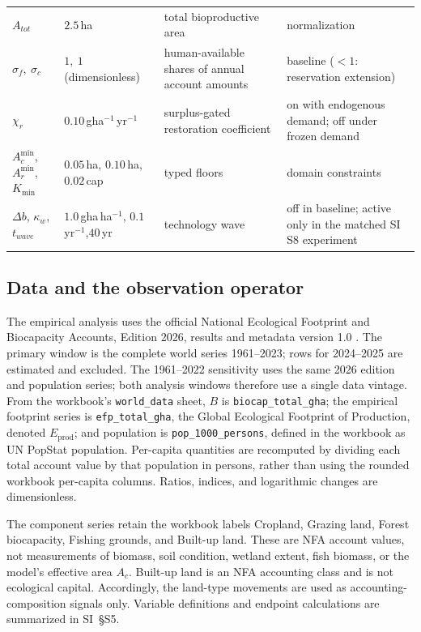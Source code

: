 \documentclass[preprint,12pt,authoryear]{elsarticle}
\newcommand{\Acmin}{A_c^{\min}}
\begin{document}
\begin{table}[!htbp]
\begin{tabularx}{\textwidth}{@{}>{\raggedright\arraybackslash}p{} >{\raggedright\arraybackslash}p{} >{\raggedright\arraybackslash}X >{\raggedright\arraybackslash}p{}@{}}
$A_{tot}$ & $2.5$\,ha & total bioproductive area & normalization \\
$\sigma_f,\ \sigma_c$ & $1,\ 1$ (dimensionless) & human-available shares of annual account amounts & baseline ($<1$: reservation extension) \\
$\chi_r$ & $0.10$\,gha$^{-1}$\,yr$^{-1}$ & surplus-gated restoration coefficient & on with endogenous demand; off under frozen demand \\
$\Acmin$, $A_r^{\min}$,\newline $K_{\min}$ & $0.05$\,ha, $0.10$\,ha,\newline $0.02$\,cap & typed floors & domain constraints \\
$\Delta b$, $\kappa_w$,\newline $t_{wave}$ & $1.0$\,gha\,ha$^{-1}$, $0.1$\,yr$^{-1}$,\newline $40$\,yr & technology wave & off in baseline; active only in the matched SI S8 experiment \\
\bottomrule
\end{tabularx}
\end{table}

\subsection{Data and the observation operator}\label{sec:data}

The empirical analysis uses the official National Ecological Footprint and Biocapacity Accounts, Edition 2026, results and metadata version 1.0 \citep{Lo2026NFA}. The primary window is the complete world series 1961--2023; rows for 2024--2025 are estimated and excluded. The 1961--2022 sensitivity uses the same 2026 edition and population series; both analysis windows therefore use a single data vintage. From the workbook's \texttt{world\_data} sheet, $B$ is \texttt{biocap\_total\_gha}; the empirical footprint series is \texttt{efp\_total\_gha}, the Global Ecological Footprint of Production, denoted $E_{\mathrm{prod}}$; and population is \texttt{pop\_1000\_persons}, defined in the workbook as UN PopStat population. Per-capita quantities are recomputed by dividing each total account value by that population in persons, rather than using the rounded workbook per-capita columns. Ratios, indices, and logarithmic changes are dimensionless.

The component series retain the workbook labels Cropland, Grazing land, Forest biocapacity, Fishing grounds, and Built-up land. These are NFA account values, not measurements of biomass, soil condition, wetland extent, fish biomass, or the model's effective area $A_c$. Built-up land is an NFA accounting class and is not ecological capital. Accordingly, the land-type movements are used as accounting-composition signals only. Variable definitions and endpoint calculations are summarized in SI~\S S5.
\end{document}
